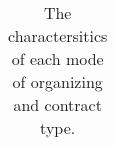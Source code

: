 \documentclass[12pt]{article}
\begin{document}
\begin{landscape}
\begin{table}
\begin{tabular}{|p{30mm}|p{87mm}|p{87mm}|}
\end{tabular}
    \caption[Differences in Organizing and Contracts]{The charactersitics of each mode of organizing and contract type.}
    \label{tab:cases}
\end{table}

\end{landscape}
\end{document}
